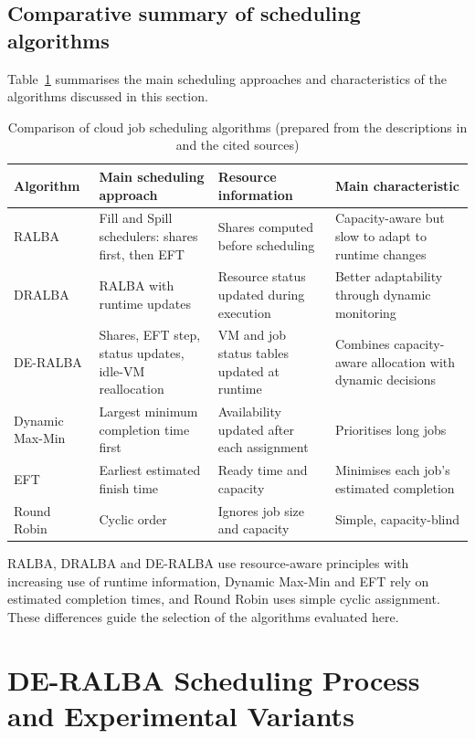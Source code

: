 \documentclass[default,sn-mathphys,Numbered]{sn-jnl}
\begin{document}
\subsection{Comparative summary of scheduling algorithms}
Table~\ref{tab:algos} summarises the main scheduling approaches and characteristics of the algorithms discussed in this section.

\begin{table}[h]
\caption{Comparison of cloud job scheduling algorithms (prepared from the descriptions in \cite{hussain2025deralba} and the cited sources)}\label{tab:algos}
\centering
\footnotesize
\begin{tabular}{p{1.7cm}p{3.6cm}p{2.9cm}p{3.2cm}}
\toprule
Algorithm & Main scheduling approach & Resource information & Main characteristic \\
\midrule
RALBA \cite{hussain2018ralba} & Fill and Spill schedulers: shares first, then EFT & Shares computed before scheduling & Capacity-aware but slow to adapt to runtime changes \\
DRALBA \cite{nabi2021dralba} & RALBA with runtime updates & Resource status updated during execution & Better adaptability through dynamic monitoring \\
DE-RALBA \cite{hussain2025deralba} & Shares, EFT step, status updates, idle-VM reallocation & VM and job status tables updated at runtime & Combines capacity-aware allocation with dynamic decisions \\
Dynamic Max-Min \cite{mao2014maxmin} & Largest minimum completion time first & Availability updated after each assignment & Prioritises long jobs \\
EFT \cite{topcuoglu2002performance} & Earliest estimated finish time & Ready time and capacity & Minimises each job's estimated completion \\
Round Robin & Cyclic order & Ignores job size and capacity & Simple, capacity-blind \\
\bottomrule
\end{tabular}
\end{table}

RALBA, DRALBA and DE-RALBA use resource-aware principles with increasing use of runtime information, Dynamic Max-Min and EFT rely on estimated completion times, and Round Robin uses simple cyclic assignment. These differences guide the selection of the algorithms evaluated here.

\section{DE-RALBA Scheduling Process and Experimental Variants}\label{sec:deralba}
\end{document}
